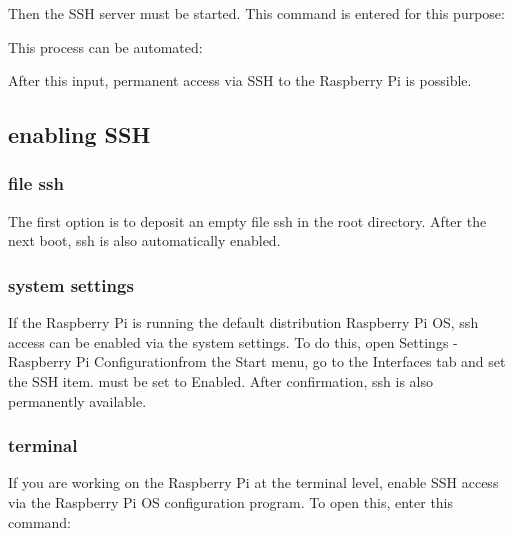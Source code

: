 \medskip



\medskip

Then the SSH server must be started. This command is entered for this purpose:

\medskip


\medskip

This process can be automated:

\medskip


\medskip

After this input, permanent access via SSH to the Raspberry Pi is possible.

\subsection{enabling SSH}


\subsubsection{file \glqq ssh\grqq{}}

The first option is to deposit an empty file \glqq ssh\grqq{} in the root directory. After the next boot, ssh is also automatically enabled.

\subsubsection{system settings}

If the Raspberry Pi is running the default distribution Raspberry Pi OS, ssh access can be enabled via the system settings. To do this, open \glqq Settings - Raspberry Pi Configuration\grqq from the Start menu, go to the \glqq Interfaces\grqq{} tab and set the \glqq SSH\grqq{} item.
must be set to \glqq Enabled\grqq{}. After confirmation, ssh is also permanently available.

\subsubsection{terminal}

If you are working on the Raspberry Pi at the terminal level, enable SSH access via the Raspberry Pi OS configuration program. To open this, enter this command:

\medskip

